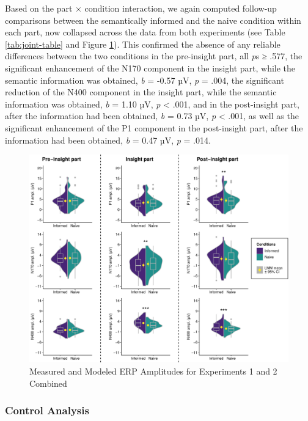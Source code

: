 \documentclass[
  english,
  doc,12pt,twoside,floatsintext]{apa7}
\begin{document}
Based on the part × condition interaction, we again computed follow-up comparisons between the semantically informed and the naive condition within each part, now collapsed across the data from both experiments (see Table \ref{tab:joint-table} and Figure \ref{fig:joint-plot}). This confirmed the absence of any reliable differences between the two conditions in the pre-insight part, all \emph{p}s ≥ .577, the significant enhancement of the N170 component in the insight part, while the semantic information was obtained, \emph{b} = -0.57 µV, \emph{p} = .004, the significant reduction of the N400 component in the insight part, while the semantic information was obtained, \emph{b} = 1.10 µV, \emph{p} \textless{} .001, and in the post-insight part, after the information had been obtained, \emph{b} = 0.73 µV, \emph{p} \textless{} .001, as well as the significant enhancement of the P1 component in the post-insight part, after the information had been obtained, \emph{b} = 0.47 µV, \emph{p} = .014.



\begin{figure}

{\centering \includegraphics[width=1\linewidth]{master_thesis_files/figure-latex/joint-plot-1} 

}

\caption{Measured and Modeled ERP Amplitudes for Experiments 1 and 2 Combined\smallskip}\label{fig:joint-plot}
\end{figure}

\hypertarget{control-analysis}{%
\subsubsection{Control Analysis}\label{control-analysis}}
\end{document}
